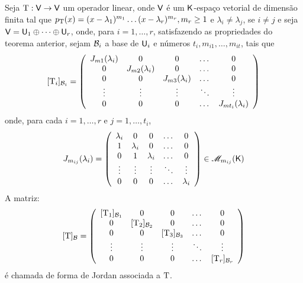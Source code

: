 \documentclass[10pt,a4paper]{book}
\begin{document}
\begin{definition}
	Seja $\mathrm{ T } : \mathsf{ V } \rightarrow \mathsf{ V }$ um operador linear, onde $\mathsf{ V }$ é um $\mathsf{ K }$-espaço vetorial de dimensão finita tal que $p_{\mathrm{ T }}(x) = (x - \lambda_1) ^ {m_1} \dots (x - \lambda_r) ^ {m_r}, m_r \geq 1$ e $\lambda_i \neq \lambda_j$, se $i \neq j$ e seja $\mathsf{ V } = \mathsf{ U }_1 \oplus \dots \oplus \mathsf{ U }_r$, onde, para $i = 1, \dots, r$, satisfazendo as propriedades do teorema anterior, sejam $\mathcal{ B }_i$ a base de $\mathsf{ U }_i$ e números $t_i, m_{i1}, \dots, m_{it}$, tais que
	\[
		[\mathrm{ T }_i]_{\mathcal{ B }_i} = \left( 
			\begin{array}{ccccc}
				J_{m1}(\lambda_i) & 0                 & 0                 & \dots  &       0 \\
				0                 & J_{m2}(\lambda_i) & 0                 & \dots  &       0 \\
				0                 & 0                 & J_{m3}(\lambda_i) & \dots  &       0 \\
				\vdots            &            \vdots & \vdots            & \ddots &       \vdots      \\
				0                 & 0                 & 0                 & \dots  & J_{m t_i}(\lambda_i)
			\end{array}
		\right)
	\]
	onde, para cada $i = 1, \dots, r$ e $j = 1, \dots, t_i$,
	\[
		J_{m_{ij}}(\lambda_i) = \left( 
			\begin{array}{ccccc}
				\lambda_i & 0         & 0         & \dots  &         0 \\
				1         & \lambda_i & 0         & \dots  &         0 \\
				0         & 1         & \lambda_i & \dots  &         0 \\
				\vdots    & \vdots    & \vdots    & \ddots &    \vdots \\
				0         & 0         & 0         & \dots  & \lambda_i
			\end{array}
		\right)
		\in \mathscr{ M }_{m_{ij}}(\mathsf{ K })
	\]
	A matriz:
	\[
		[\mathrm{ T }]_{\mathcal{ B }} = \left( 
			\begin{array}{ccccc}
				[\mathrm{ T }_1]_{\mathcal{ B }_1} & 0               & 0               & \dots  &       0 \\
				0               & [\mathrm{ T }_2]_{\mathcal{ B }_2} & 0               & \dots  &       0 \\
				0               & 0               & [\mathrm{ T }_3]_{\mathcal{ B }_3} & \dots  &       0 \\
				\vdots          &          \vdots & \vdots          & \ddots &       \vdots      \\
				0               & 0               & 0               & \dots  & [\mathrm{ T }_r]_{\mathcal{ B }_r}
			\end{array}
		\right)
	\]
	é chamada de forma de Jordan associada a $\mathrm{ T }$.
\end{definition}
\end{document}
